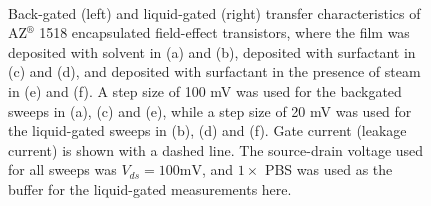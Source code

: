 \documentclass[
  letterpaper,
  DIV=11,
  numbers=noendperiod]{scrartcl}
\begin{document}
\begin{figure}
\begin{minipage}[t]{0.45\linewidth}
{{}

}

\end{minipage}%
%
\begin{minipage}[t]{0.01\linewidth}

{\centering 

~

}

\end{minipage}%

\caption{\label{fig-pristine-cnt-characteristics}Back-gated (left) and
liquid-gated (right) transfer characteristics of AZ\(^\circledR\) 1518
encapsulated field-effect transistors, where the film was deposited with
solvent in (a) and (b), deposited with surfactant in (c) and (d), and
deposited with surfactant in the presence of steam in (e) and (f). A
step size of 100 mV was used for the backgated sweeps in (a), (c) and
(e), while a step size of 20 mV was used for the liquid-gated sweeps in
(b), (d) and (f). Gate current (leakage current) is shown with a dashed
line. The source-drain voltage used for all sweeps was
\(V_{ds} = 100 \textrm{mV}\), and \(1 \times\) PBS was used as the
buffer for the liquid-gated measurements here.}

\end{figure}
\end{document}
